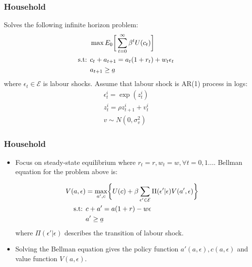 \documentclass{beamer}
\newcommand{\ubar}[1]{\underaccent{\bar}{#1}}
\begin{document}
\begin{frame}
\frametitle{Household} 
Solves the following infinite horizon problem: 
\begin{equation}
\begin{aligned}
& \max E_0 \bigg[ 
\sum_{t=0}^{\infty} \beta^t U(c_t )	\bigg] \\
 \text{s.t: } 
& c_t + a_{t+1} = a_t (1 + r_t)  + w_t \epsilon_t \\ 
& a_{t+1} \geq \ubar{a} \\ 
\end{aligned}
\end{equation}
where $\epsilon_t \in \mathcal{E}$ is labour shocks. Assume that labour shock is AR(1) process in logs: 
\begin{equation}
\begin{aligned}
\epsilon_t^i = \exp(z_t^i) \\ 
z_t^i = \rho z_{t+1}^i + v_t^i \\ 
v \sim N(0,\sigma_v^2)
\end{aligned}
\end{equation}
\end{frame}





\begin{frame}
\frametitle{Household}
\begin{itemize}

\item Focus on steady-state equilibrium where $r_t = r, w_t = w, \forall t=0,1...$. Bellman equation for the problem above is: 

\begin{equation}
\begin{aligned}
V(a,\epsilon) 
& = \underset{a',c}{\max } 
\bigg\{ U(c) 
	+ \beta \sum_{\epsilon' \in \mathcal{E} } \Pi(\epsilon'|\epsilon) V(a',\epsilon) 
		\bigg\} \\ 
\text{s.t: } 
& c + a' = a(1+r) - w \epsilon  \\ 
& a' \geq \ubar{a} \\ 
\end{aligned}
\end{equation}
where $\Pi(\epsilon'|\epsilon)$ describes the transition of labour shock. \\  

\item Solving the Bellman equation gives the policy function $a'(a,\epsilon),c(a,\epsilon)$ and value function $V(a,\epsilon)$. 
\end{itemize}
\end{frame}
\end{document}

